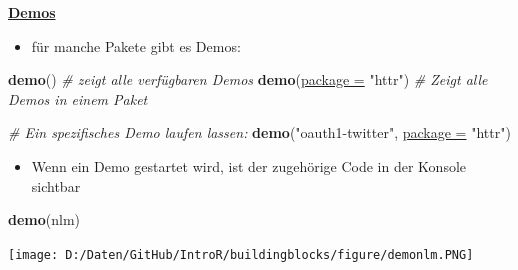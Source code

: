 \documentclass[ignorenonframetext,]{beamer}
\newenvironment{Shaded}{\begin{snugshade}}{\end{snugshade}}
\newcommand{\KeywordTok}[1]{\textcolor[rgb]{0.26,0.66,0.93}{\textbf{#1}}}
\newcommand{\DataTypeTok}[1]{\textcolor[rgb]{0.74,0.68,0.62}{\underline{#1}}}
\newcommand{\StringTok}[1]{\textcolor[rgb]{0.02,0.61,0.04}{#1}}
\newcommand{\CommentTok}[1]{\textcolor[rgb]{0.00,0.40,1.00}{\textit{#1}}}
\newcommand{\NormalTok}[1]{\textcolor[rgb]{0.74,0.68,0.62}{#1}}
\providecommand{\tightlist}{%
  \setlength{\itemsep}{0pt}\setlength{\parskip}{0pt}}
\begin{document}
\begin{frame}[fragile]{\href{http://r-pkgs.had.co.nz/demo.html}{\textbf{Demos}}}

\begin{itemize}
\tightlist
\item
  für manche Pakete gibt es Demos:
\end{itemize}

\begin{Shaded}
\begin{Highlighting}[]
\KeywordTok{demo}\NormalTok{() }\CommentTok{# zeigt alle verfügbaren Demos}
\KeywordTok{demo}\NormalTok{(}\DataTypeTok{package =} \StringTok{"httr"}\NormalTok{) }\CommentTok{# Zeigt alle Demos in einem Paket}

\CommentTok{# Ein spezifisches Demo laufen lassen:}
\KeywordTok{demo}\NormalTok{(}\StringTok{"oauth1-twitter"}\NormalTok{, }\DataTypeTok{package =} \StringTok{"httr"}\NormalTok{) }
\end{Highlighting}
\end{Shaded}

\begin{itemize}
\tightlist
\item
  Wenn ein Demo gestartet wird, ist der zugehörige Code in der Konsole
  sichtbar
\end{itemize}

\begin{Shaded}
\begin{Highlighting}[]
\KeywordTok{demo}\NormalTok{(nlm)}
\end{Highlighting}
\end{Shaded}

\texttt{[image: D:/Daten/GitHub/IntroR/buildingblocks/figure/demonlm.PNG]}

\end{frame}
\end{document}

